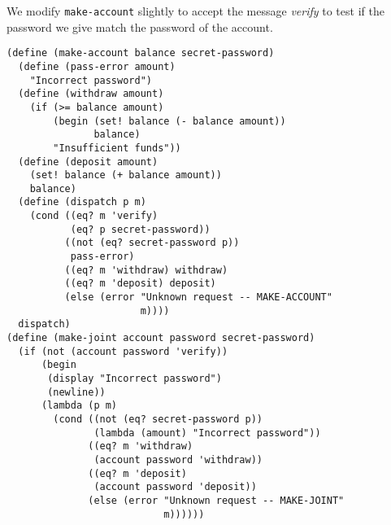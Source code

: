 \documentclass[a4paper,12pt]{article}
\begin{document}
We modify \lstinline!make-account! slightly to accept the message
\emph{verify} to test if the password we give match the password of
the account.
\begin{lstlisting}
(define (make-account balance secret-password)
  (define (pass-error amount)
    "Incorrect password")
  (define (withdraw amount)
    (if (>= balance amount)
        (begin (set! balance (- balance amount))
               balance)
        "Insufficient funds"))
  (define (deposit amount)
    (set! balance (+ balance amount))
    balance)
  (define (dispatch p m)
    (cond ((eq? m 'verify)
           (eq? p secret-password))
          ((not (eq? secret-password p))
           pass-error)
          ((eq? m 'withdraw) withdraw)
          ((eq? m 'deposit) deposit)
          (else (error "Unknown request -- MAKE-ACCOUNT"
                       m))))
  dispatch)
(define (make-joint account password secret-password)
  (if (not (account password 'verify))
      (begin 
       (display "Incorrect password")
       (newline))
      (lambda (p m)
        (cond ((not (eq? secret-password p))
               (lambda (amount) "Incorrect password"))
              ((eq? m 'withdraw)
               (account password 'withdraw))
              ((eq? m 'deposit)
               (account password 'deposit))
              (else (error "Unknown request -- MAKE-JOINT"
                           m))))))
\end{lstlisting}
\end{document}
